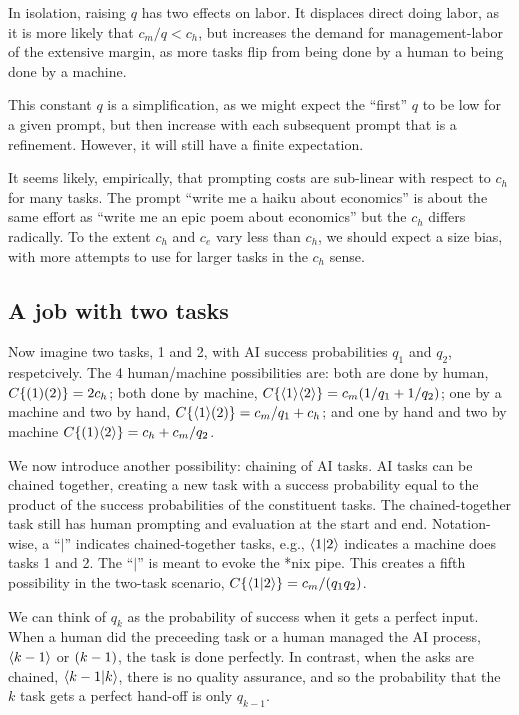 \documentclass{article}
\begin{document}
In isolation, raising $q$ has two effects on labor.
It displaces direct doing labor, as it is more likely that $c_m/q < c_h$, but increases the demand for management-labor of the extensive margin, as more tasks flip from being done by a human to being done by a machine.

This constant $q$ is a simplification, as we might expect the ``first'' $q$ to be low for a given prompt, but then increase with each subsequent prompt that is a refinement.
However, it will still have a finite expectation.

It seems likely, empirically, that prompting costs are sub-linear with respect to $c_h$ for many tasks.
The prompt ``write me a haiku about economics'' is about the same effort as ``write me an epic poem about economics'' but the $c_h$ differs radically. 
To the extent $c_h$ and $c_e$ vary less than $c_h$, we should expect a size bias, with more attempts to use for larger tasks in the $c_h$ sense.  

\subsection{A job with two tasks}
Now imagine two tasks, 1 and 2, with AI success probabilities $q_1$ and $q_2$, respetcively.
The 4 human/machine possibilities are: both are done by human, $C\{ ( 1 )( 2 ) \} = 2 c_h$; both done by machine, $C\{ \langle 1 \rangle\langle 2 \rangle \} = c_m (1/q_1 + 1/q_2)$; one by a machine and two by hand, $C\{ \langle 1 \rangle( 2 ) \} = c_m/q_1 + c_h$; and one by hand and two by machine $C\{ ( 1 )\langle 2 \rangle \} = c_h + c_m/q_2$.

We now introduce another possibility: chaining of AI tasks.
AI tasks can be chained together, creating a new task with a success probability equal to the product of the success probabilities of the constituent tasks.
The chained-together task still has human prompting and evaluation at the start and end.
Notation-wise, a ``$|$'' indicates chained-together tasks, e.g.,  $\langle 1|2 \rangle$ indicates a machine does tasks 1 and 2.
The ``$|$'' is meant to evoke the *nix pipe.
This creates a fifth possibility in the two-task scenario, $C\{ \langle 1|2 \rangle \} = c_m/(q_1q_2)$.

We can think of $q_k$ as the probability of success when it gets a perfect input.
When a human did the preceeding task or a human managed the AI process, $\langle k-1 \rangle$ or $( k-1 )$, the task is done perfectly.
In contrast, when the asks are chained, $\langle k-1|k \rangle$, there is no quality assurance, and so the probability that the $k$ task gets a perfect hand-off is only $q_{k-1}$.
\end{document}
